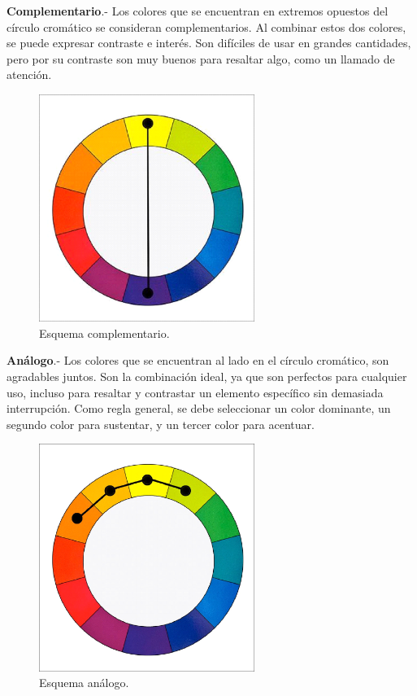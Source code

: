 \textbf{Complementario}.- Los colores que se encuentran en extremos opuestos del círculo cromático se consideran complementarios. Al combinar estos dos colores, se puede expresar contraste e interés. Son difíciles de usar en grandes cantidades, pero por su contraste son muy buenos para resaltar algo, como un llamado de atención.
\begin{figure}[h!]
	\centering
	\includegraphics[width=7cm]{imagenes/marcoteorico/disenointeriores/complementario.png}
	\caption{Esquema complementario.\cite{B13}}
	\label{fig:complementario}
\end{figure}

\textbf{Análogo}.- Los colores que se encuentran al lado en el círculo cromático, son agradables juntos. Son la combinación ideal, ya que son perfectos para cualquier uso, incluso para resaltar y contrastar un elemento específico sin demasiada interrupción. Como regla general, se debe seleccionar un color dominante, un segundo color para sustentar, y un tercer color para acentuar.
\begin{figure}[h!]
	\centering
	\includegraphics[width=7cm]{imagenes/marcoteorico/disenointeriores/analogo.png}
	\caption{Esquema análogo.\cite{B13}}
	\label{fig:analogo}
\end{figure}


\par 
